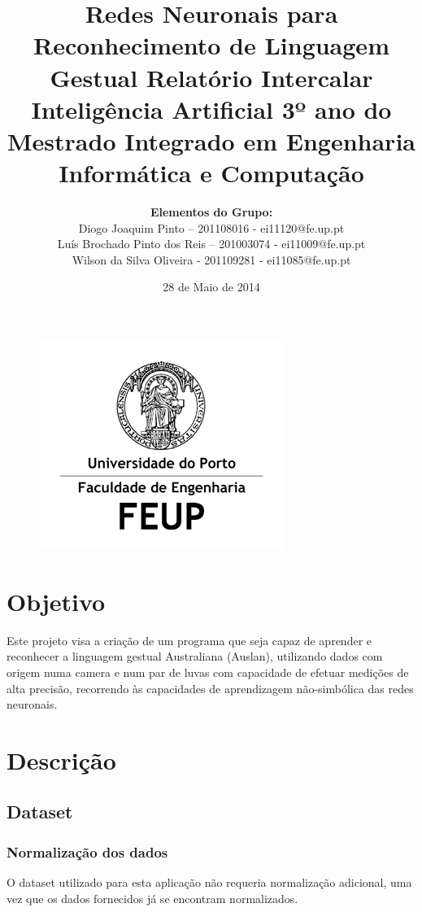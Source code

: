 \documentclass[10pt,a4paper]{article}
\title{\Huge\textbf{Redes Neuronais para Reconhecimento de Linguagem Gestual}\linebreak\linebreak\linebreak
\Large\textbf{Relatório Intercalar}\linebreak\linebreak
\Large{Inteligência Artificial}\linebreak
\Large{3º ano do Mestrado Integrado em Engenharia Informática e Computação} \linebreak \linebreak}
\author{\textbf{Elementos do Grupo:}\\ Diogo Joaquim Pinto – 201108016 - ei11120@fe.up.pt \\ Luís Brochado Pinto dos Reis – 201003074 - ei11009@fe.up.pt \\ Wilson da Silva Oliveira - 201109281 - ei11085@fe.up.pt}
\date{28 de Maio de 2014}
\begin{document}
\begin{figure}
\centering
\includegraphics[width=0.7\linewidth]{./LogoFeup}
\end{figure}

\maketitle

\tableofcontents

\newpage

\section{Objetivo}

Este projeto visa a criação de um programa que seja capaz de aprender e reconhecer a linguagem gestual Australiana  (Auslan), utilizando dados com origem numa camera e num par de luvas com capacidade de efetuar medições de alta precisão, recorrendo às capacidades de aprendizagem não-simbólica das redes neuronais.

\section{Descrição}

\subsection{Dataset}

\subsubsection{Normalização dos dados}

O dataset utilizado para esta aplicação não requeria normalização adicional, uma vez que os dados fornecidos já se encontram normalizados. 
\end{document}
